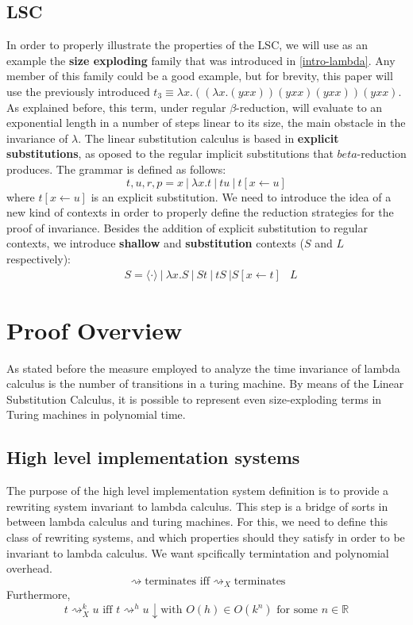 \documentclass[12pt]{article}
\begin{document}
\subsection{LSC}
In order to properly illustrate the properties of the LSC, we will use as an example the \textbf{size exploding} family that was introduced in \ref{intro-lambda}. Any member of this family could be a good example, but for brevity, this paper will use the previously introduced $t_{3} \equiv \lambda x.((\lambda x. (yxx))(yxx)(yxx))(yxx)$. As explained before, this term, under regular $\beta$-reduction, will evaluate to an exponential length in a number of steps linear to its size, the main obstacle in the invariance of $\lambda$.
The linear substitution calculus is based in \textbf{explicit substitutions}, as oposed to the regular implicit substitutions that $beta$-reduction produces. The grammar is defined as follows:
\begin{equation}
  t, u, r, p = x \ | \ \lambda x.t \ | \ tu \ | \ t[x \leftarrow u]
\end{equation}
where $t[x \leftarrow u]$ is an explicit substitution.
We need to introduce the idea of a new kind of contexts in order to properly define the reduction strategies for the proof of invariance. Besides the addition of explicit substitution to regular contexts, we introduce \textbf{shallow} and \textbf{substitution} contexts ($S$ and $L$ respectively):
\begin{equation}
  \begin{split}
    &S = \langle \cdot \rangle \ | \ \lambda x.S \ | \ St \ | \ tS \ | S[x \leftarrow t]
    &L
  \end{split}
\end{equation}


\section{Proof Overview}
As stated before the measure employed to analyze the time invariance of lambda calculus is the number of transitions in a turing machine. By means of the Linear Substitution Calculus, it is possible to represent even size-exploding terms in Turing machines in polynomial time.
\subsection{High level implementation systems}
The purpose of the high level implementation system definition is to provide a rewriting system invariant to lambda calculus. This step is a bridge of sorts in between lambda calculus and turing machines. For this, we need to define this class of rewriting systems, and which properties should they satisfy in order to be invariant to lambda calculus. We want spcifically termintation and polynomial overhead.
$$\rightsquigarrow \text{terminates iff} {\rightsquigarrow}_{X} \text{terminates}$$
Furthermore,
$$t {\rightsquigarrow}_{X}^k u \text{ iff } t {\rightsquigarrow}^h u\downarrow \text{with } O(h) \in O(k^n) \text{ for some } n \in \mathbb{R} $$
\end{document}
